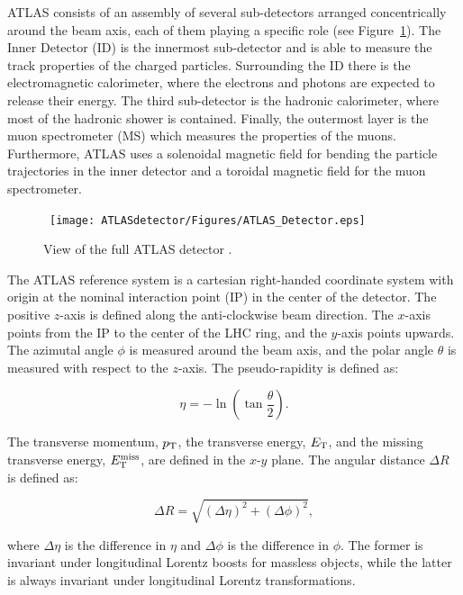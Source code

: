 ATLAS consists of an assembly of several sub-detectors arranged concentrically around the beam axis, each of them playing a specific role (see Figure~\ref{fig:ATLASsketch}). 
The Inner Detector (ID) is the innermost sub-detector and is able to measure the track properties of the charged particles. 
Surrounding the ID there is the electromagnetic calorimeter, where the electrons and photons are expected to release their energy. 
The third sub-detector is the hadronic calorimeter, where most of the hadronic shower is contained.
Finally, the outermost layer is the muon spectrometer (MS) which measures the properties of the muons.
Furthermore, ATLAS uses a solenoidal magnetic field for bending the particle trajectories in the inner detector and a toroidal magnetic field for the muon spectrometer.

\begin{figure}[!ht]
  \begin{center}
    \mbox{
      \texttt{[image: ATLASdetector/Figures/ATLAS\_Detector.eps]}
    }
  \end{center}
  \caption[View of the full ATLAS detector.]{View of the full ATLAS detector \protect\cite{Evans:2008zzb}.}
  \label{fig:ATLASsketch}
\end{figure}

The ATLAS reference system is a cartesian right-handed coordinate system with origin at the nominal interaction point (IP) in the center of the detector. 
The positive $z$-axis is defined along the anti-clockwise beam direction.
The $x$-axis points from the IP to the center of the LHC ring, and the $y$-axis points upwards. 
The azimutal angle $\phi$ is measured around the beam axis, and the polar angle $\theta$ is measured with respect to the $z$-axis.
The pseudo-rapidity is defined as:

\begin{equation}
  \eta = -\ln{\left(\tan{\frac{\theta}{2}}\right)}.
  \label{eq:pseudorapidity}
\end{equation}

The transverse momentum, $p_{\mathrm{T}}$, the transverse energy, $E_{\mathrm{T}}$, and the missing transverse energy, $E_{\mathrm{T}}^{\mathrm{miss}}$, are defined in the $x$-$y$ plane.
The angular distance $\Delta R$ is defined as:

\begin{equation}
  \Delta R = \sqrt{(\Delta\eta)^2 + (\Delta\phi)^2}, 
  \label{eq:deltaR}
\end{equation}

\noindent where $\Delta\eta$ is the difference in $\eta$ and $\Delta\phi$ is the difference in $\phi$.
The former is invariant under longitudinal Lorentz boosts for massless objects, while the latter is always invariant under longitudinal Lorentz transformations.

